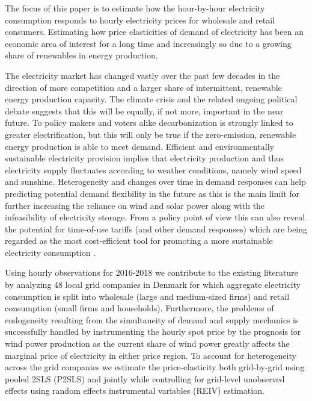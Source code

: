 \label{sec:intro}
The focus of this paper is to estimate how the hour-by-hour electricity consumption responds to hourly electricity prices for wholesale and retail consumers. Estimating how price elasticities of demand of electricity has been an economic area of interest for a long time and increasingly so due to a growing share of renewables in energy production.
\bigskip \par
The electricity market has changed vastly over the past few decades in the direction of more competition and a larger share of intermittent, renewable energy production capacity. The climate crisis and the related ongoing political debate suggests that this will be equally, if not more, important in the near future. To policy makers and voters alike decarbonization is strongly linked to greater electrification, but this will only be true if the zero-emission, renewable energy production is able to meet demand. Efficient and environmentally sustainable electricity provision implies that electricity production and thus electricity supply fluctuates according to weather conditions, namely wind speed and sunshine. Heterogeneity and changes over time in demand responses can help predicting potential demand flexibility in the future as this is the main limit for further increasing the reliance on wind and solar power along with the infeasibility of electricity storage. From a policy point of view this can also reveal the potential for time-of-use tariffs (and other demand responses) which are being regarded as the most cost-efficient tool for promoting a more sustainable electricity consumption \citep{albadi2008summary}.
\bigskip \par
Using hourly observations for 2016-2018 we contribute to the existing literature by analyzing 48 local grid companies in Denmark for which aggregate electricity consumption is split into wholesale (large and medium-sized firms) and retail consumption (small firms and households). Furthermore, the problems of endogeneity resulting from the simultaneity of demand and supply mechanics is successfully handled by instrumenting the hourly spot price by the prognosis for wind power production as the current share of wind power greatly affects the marginal price of electricity in either price region. To account for heterogeneity across the grid companies we estimate the price-elasticity both grid-by-grid using pooled 2SLS (P2SLS) and jointly while controlling for grid-level unobserved effects using random effects instrumental variables (REIV) estimation.
